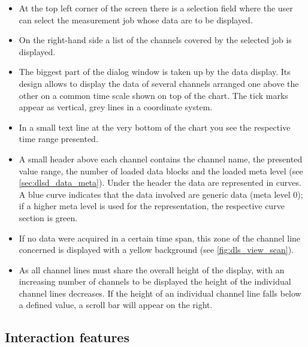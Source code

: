 \documentclass[a4paper,12pt,BCOR6mm,bibtotoc,idxtotoc]{scrbook}
\begin{document}
\begin{itemize}

\item At the top left corner of the screen there is a selection field where
the user can select the measurement job whose data are to be displayed.

\item On the right-hand side a list of the channels covered by the selected
job is displayed.

\item The biggest part of the dialog window is taken up by the data display.
Its design allows to display the data of several channels arranged one above
the other on a common time scale shown on top of the chart. The tick marks
appear as vertical, grey lines in a coordinate system.

\item In a small text line at the very bottom of the chart you see the
respective time range presented.

\item A small header above each channel contains the channel name, the
presented value range, the number of loaded data blocks and the loaded meta
level (see \autoref{sec:dlsd_data_meta}). Under the header the data are
represented in curves. A blue curve indicates that the data involved are
generic data (meta level 0); if a higher meta level is used for the
representation, the respective curve section is green.

\item If no data were acquired in a certain time span, this zone of the
channel line concerned is displayed with a yellow background (see
\autoref{fig:dls_view_scan}).

\item As all channel lines must share the overall height of the display, with
an increasing number of channels to be displayed the height of the individual
channel lines decreases. If the height of an individual channel line falls
below a defined value, a scroll bar will appear on the right.

\end{itemize}


\subsection{Interaction features}
\end{document}
